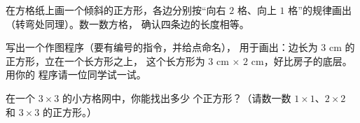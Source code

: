 \begin{exercise}[$\star\star$]\label{exo:g3:shapes:9}
在方格纸上画一个倾斜的正方形，各边分别按“向右 $2$ 格、向上 $1$
格”的规律画出（转弯处同理）。数一数方格，
确认四条边的长度相等。
\end{exercise}

\begin{exercise}[$\star\star$]\label{exo:g3:shapes:10}
写出一个作图程序（要有编号的指令，并给点命名），
用于画出：边长为 $3$ cm 的正方形，立在一个长方形之上，
这个长方形为 $3$ cm $\times$ $2$ cm，好比房子的底层。用你的
程序请一位同学试一试。
\end{exercise}

\begin{exercise}[$\star\star$]\label{exo:g3:shapes:11}
在一个 $3 \times 3$ 的小方格网中，你能找出多少
个正方形？（请数一数 $1 \times 1$、$2 \times 2$ 和
$3 \times 3$ 的正方形。）
\end{exercise}
